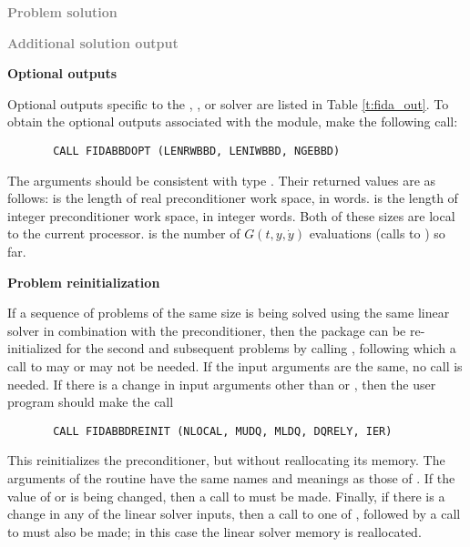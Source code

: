 \begin{Steps}
\item \textcolor{gray}{\bf Problem solution}

\item \textcolor{gray}{\bf Additional solution output}

\item {\bf {\idabbdpre} Optional outputs}

  Optional outputs specific to the {\spgmr}, {\spbcg}, or {\sptfqmr} solver are
  listed in Table \ref{t:fida_out}.
  To obtain the optional outputs associated with the {\idabbdpre}
  module, make the following call:
\begin{verbatim}
       CALL FIDABBDOPT (LENRWBBD, LENIWBBD, NGEBBD)
\end{verbatim}
  The arguments should be consistent with {\CC} type .  Their
  returned values are as follows:
   is the length of real preconditioner work space, in 
  words.   is the length of integer preconditioner work space, in
  integer words.  Both of these sizes are local to the current processor.
   is the number of $G(t,y,\dot{y})$ evaluations (calls to )
  so far.

\item {\bf Problem reinitialization}

  If a sequence of problems of the same size is being solved using the same
  linear solver in combination with the {\idabbdpre}
  preconditioner, then the {\ida} package can be re-initialized for the second
  and subsequent problems by calling , following which a call
  to  may or  may not be needed.
  If the input arguments are the same, no  call is needed.
  If there is a change in input arguments other than  or ,
  then the user program should make the call
\begin{verbatim}
       CALL FIDABBDREINIT (NLOCAL, MUDQ, MLDQ, DQRELY, IER)
\end{verbatim}
  This reinitializes the {\idabbdpre} preconditioner, but without
  reallocating its memory.  The arguments of the 
  routine have the same names and meanings as those of .
  If the value of  or  is being changed, then a call to
   must be made.  Finally, if there is a change in any of the
  linear solver inputs, then a call to one of ,
  followed by a call to  must
  also be made; in this case the linear solver memory is reallocated.


\end{Steps}

